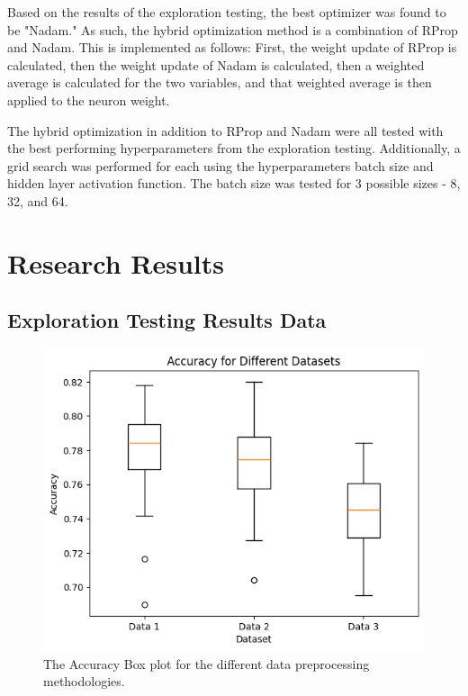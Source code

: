 \documentclass[conference]{IEEEtran}
\begin{document}
Based on the results of the exploration testing, the best optimizer was found to be "Nadam." As such, the hybrid optimization method is a combination of RProp and Nadam. This is implemented as follows: First, the weight update of RProp is calculated, then the weight update of Nadam is calculated, then a weighted average is calculated for the two variables, and that weighted average is then applied to the neuron weight. 

The hybrid optimization in addition to RProp and Nadam were all tested with the best performing hyperparameters from the exploration testing. Additionally, a grid search was performed for each using the hyperparameters batch size and hidden layer activation function. The batch size was tested for 3 possible sizes - 8, 32, and 64. 

\section{Research Results }

\subsection{Exploration Testing Results Data}

\begin{figure}[htbp]
\centerline{\includegraphics[width=\columnwidth]{Ex Per Data Pre Pros Box Acc.png}}
\caption{The Accuracy Box plot for the different data preprocessing methodologies.}
\label{fig}
\end{figure}
\end{document}
